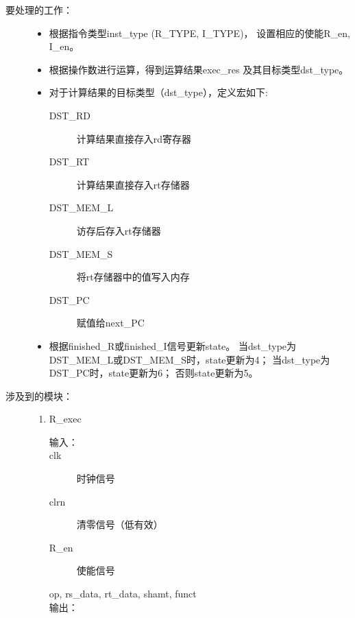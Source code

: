 \documentclass[12pt,a4paper,UTF8]{article}
\begin{document}
\begin{description}
  \item[要处理的工作：] \hspace*{\fill}
        \begin{itemize}
          \item 根据指令类型inst\_type (R\_TYPE, I\_TYPE)，
                设置相应的使能R\_en, I\_en。
          \item 根据操作数进行运算，得到运算结果exec\_res
                及其目标类型dst\_type。
          \item 对于计算结果的目标类型（dst\_type），定义宏如下:
                \begin{description}
                  \item[DST\_RD] 计算结果直接存入rd寄存器
                  \item[DST\_RT] 计算结果直接存入rt存储器
                  \item[DST\_MEM\_L] 访存后存入rt存储器
                  \item[DST\_MEM\_S] 将rt存储器中的值写入内存
                  \item[DST\_PC] 赋值给next\_PC
                \end{description}
          \item 根据finished\_R或finished\_I信号更新state。
                当dst\_type为DST\_MEM\_L\linebreak[4]
                或DST\_MEM\_S时，state更新为4；
                当dst\_type为DST\_PC时，state更新为6；
                否则state更新为5。
        \end{itemize}
  \item[涉及到的模块：] \hspace*{\fill}
        \begin{enumerate}
          \item R\_exec
                \begin{description}
                  \item[输入：] \hspace*{\fill}
                  \item[clk] 时钟信号
                  \item[clrn] 清零信号（低有效）
                  \item[R\_en] 使能信号
                  \item[op, rs\_data, rt\_data, shamt, funct] \hspace*{\fill}
                  \item[输出：] \hspace*{\fill}

\end{description}
\end{enumerate}
\end{description}
\end{document}
